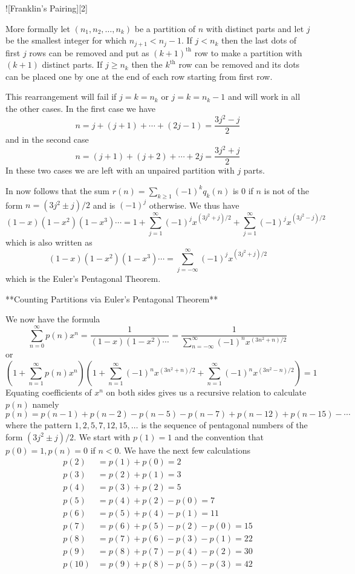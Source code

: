 ![Franklin's Pairing][2]

More formally let $(n_{1}, n_{2}, \ldots, n_{k})$ be a partition of $n$ with distinct parts and let $j$ be the smallest integer for which $n_{j + 1} < n_{j} - 1$. If $j < n_{k}$ then the last dots of first $j$ rows can be removed and put as $(k + 1)^{\text{th}}$ row to make a partition with $(k + 1)$ distinct parts. If $j \geq n_{k}$ then the $k^{\text{th}}$ row can be removed and its dots can be placed one by one at the end of each row starting from first row.

This rearrangement will fail if $j = k = n_{k}$ or $j = k = n_{k} - 1$ and will work in all the other cases. In the first case we have $$n = j + (j + 1) + \cdots + (2j - 1) = \frac{3j^{2} - j}{2}$$ and in the second case $$n = (j + 1) + (j + 2) + \cdots + 2j = \frac{3j^{2} + j}{2}$$ In these two cases we are left with an unpaired partition with $j$ parts.

In now follows that the sum $r(n) = \sum_{k \geq 1}(-1)^{k}q_{k}(n)$ is $0$ if $n$ is not of the form $n = (3j^{2} \pm j)/2$ and is $(-1)^{j}$ otherwise. We thus have $$(1 - x)(1 - x^{2})(1 - x^{3})\cdots = 1 + \sum_{j = 1}^{\infty}(-1)^{j}x^{(3j^{2} + j)/2} + \sum_{j = 1}^{\infty}(-1)^{j}x^{(3j^{2} - j)/2}$$ which is also written as $$(1 - x)(1 - x^{2})(1 - x^{3})\cdots = \sum_{j = -\infty}^{\infty}(-1)^{j}x^{(3j^{2} + j)/2}$$ which is the Euler's Pentagonal Theorem.

**Counting Partitions via Euler's Pentagonal Theorem**

We now have the formula $$\sum_{n = 0}^{\infty}p(n)x^{n} = \frac{1}{(1 - x)(1 - x^{2})\cdots} = \dfrac{1}{{\displaystyle \sum_{n = -\infty}^{\infty}(-1)^{n}x^{(3n^{2} + n)/2}}}$$ or $$\left(1 + \sum_{n = 1}^{\infty}p(n)x^{n}\right)\left(1 + \sum_{n = 1}^{\infty}(-1)^{n}x^{(3n^{2} + n)/2} + \sum_{n = 1}^{\infty}(-1)^{n}x^{(3n^{2} - n)/2}\right) = 1$$ Equating coefficients of $x^{n}$ on both sides gives us a recursive relation to calculate $p(n)$ namely $$p(n) = p(n - 1) + p(n - 2) - p(n - 5) - p(n - 7) + p(n - 12) + p(n - 15) - \cdots$$ where the pattern $1, 2, 5, 7, 12, 15,\ldots$ is the sequence of pentagonal numbers of the form $(3j^{2} \pm j)/2$. We start with $p(1) = 1$ and the convention that $p(0) = 1, p(n) = 0$ if $n < 0$. We have the next few calculations $$\begin{aligned}p(2) &= p(1) + p(0) = 2\\
p(3) &= p(2) + p(1) = 3\\
p(4) &= p(3) + p(2) = 5\\
p(5) &= p(4) + p(2) - p(0) = 7\\
p(6) &= p(5) + p(4) - p(1) = 11\\
p(7) &= p(6) + p(5) - p(2) - p(0) = 15\\
p(8) &= p(7) + p(6) - p(3) - p(1) = 22\\
p(9) &= p(8) + p(7) - p(4) - p(2) = 30\\
p(10) &= p(9) + p(8) - p(5) - p(3) = 42\end{aligned}$$

